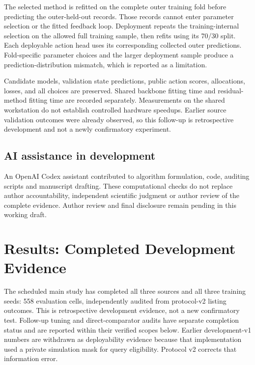 \documentclass[10pt,journal]{IEEEtran}
\begin{document}
The selected method is refitted on the complete outer training fold before
predicting the outer-held-out records. Those records cannot enter parameter
selection or the fitted feedback loop. Deployment repeats the training-internal
selection on the allowed full training sample, then refits using its 70/30
split. Each deployable action head uses its corresponding collected outer
predictions. Fold-specific parameter choices and the larger deployment sample
produce a prediction-distribution mismatch, which is reported as a limitation.

Candidate models, validation state predictions, public action scores,
allocations, losses, and all choices are preserved. Shared backbone fitting
time and residual-method fitting time are recorded separately. Measurements on
the shared workstation do not establish controlled hardware speedups. Earlier
source validation outcomes were already observed, so this follow-up is
retrospective development and not a newly confirmatory experiment.


\subsection{AI assistance in development}
An OpenAI Codex assistant contributed to algorithm formulation, code, auditing
scripts and manuscript drafting. These computational checks do not replace
author accountability, independent scientific judgment or author review of
the complete evidence. Author review and final disclosure remain pending in
this working draft.

\section{Results: Completed Development Evidence}
The scheduled main study has completed all three sources and all three
training seeds: 558 evaluation cells, independently audited from
protocol-v2 listing outcomes. This is retrospective development evidence,
not a new confirmatory test. Follow-up tuning and direct-comparator
audits have separate completion status and are reported within their
verified scopes below.
Earlier development-v1 numbers are withdrawn as deployability evidence
because that implementation used a private simulation mask for query
eligibility. Protocol v2 corrects that information error.
\end{document}
